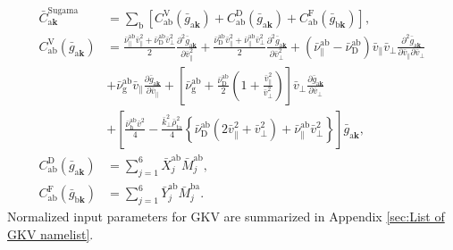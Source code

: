 \begin{align}
  \bar{C}_{\mathrm{a}\bm{k}}^\mathrm{Sugama} &= \sum_\mathrm{b} \left[ C^\mathrm{V}_\mathrm{ab}(\bar{g}_{\mathrm{a}\bm{k}}) + C^\mathrm{D}_\mathrm{ab}(\bar{g}_{\mathrm{a}\bm{k}}) + C^\mathrm{F}_\mathrm{ab}(\bar{g}_{\mathrm{b}\bm{k}}) \right], \\
  C^\mathrm{V}_\mathrm{ab}(\bar{g}_{\mathrm{a}\bm{k}}) &= \frac{\bar{\nu}_\parallel^\mathrm{ab}\bar{v}_\parallel^2+\bar{\nu}_\mathrm{D}^\mathrm{ab}\bar{v}_\perp^2}{2}\frac{\partial^2 \bar{g}_{\mathrm{a}\bm{k}}}{\partial \bar{v}_\parallel^2} + \frac{\bar{\nu}_\mathrm{D}^\mathrm{ab}\bar{v}_\parallel^2+\bar{\nu}_\parallel^\mathrm{ab}\bar{v}_\perp^2}{2}\frac{\partial^2 \bar{g}_{\mathrm{a}\bm{k}}}{\partial \bar{v}_\perp^2} + (\bar{\nu}_\parallel^\mathrm{ab}-\bar{\nu}_\mathrm{D}^\mathrm{ab})\bar{v}_\parallel \bar{v}_\perp \frac{\partial^2 \bar{g}_{\mathrm{a}\bm{k}}}{\partial \bar{v}_\parallel \partial \bar{v}_\perp} \nonumber \\
  &+ \bar{\nu}_\mathrm{g}^\mathrm{ab} \bar{v}_\parallel \frac{\partial \bar{g}_{\mathrm{a}\bm{k}}}{\partial \bar{v}_\parallel} + \left[ \bar{\nu}_\mathrm{g}^\mathrm{ab} + \frac{\bar{\nu}_\mathrm{D}^\mathrm{ab}}{2} \left( 1 + \frac{\bar{v}_\parallel^2}{\bar{v}_\perp^2} \right) \right] \bar{v}_\perp \frac{\partial \bar{g}_{\mathrm{a}\bm{k}}}{\partial \bar{v}_\perp} \nonumber \\
  &+\left[ \frac{\bar{\nu}_\mathrm{h}^\mathrm{ab} \bar{v}^2}{4} - \frac{\bar{k}_\perp^2\bar{\rho}_\mathrm{ta}^2}{4} \left\{ \bar{\nu}_\mathrm{D}^\mathrm{ab} (2\bar{v}_\parallel^2 + \bar{v}_\perp^2) + \bar{\nu}_\parallel^\mathrm{ab} \bar{v}_\perp^2 \right\} \right] \bar{g}_{\mathrm{a}\bm{k}}, \\
  C^\mathrm{D}_\mathrm{ab}(\bar{g}_{\mathrm{a}\bm{k}}) &= \sum_{j=1}^6 \bar{X}_j^\mathrm{ab} \bar{M}_j^\mathrm{ab}, \\ 
  C^\mathrm{F}_\mathrm{ab}(\bar{g}_{\mathrm{b}\bm{k}}) &= \sum_{j=1}^6 \bar{Y}_j^\mathrm{ab} \bar{M}_j^\mathrm{ba}.
\end{align}
Normalized input parameters for GKV are summarized in Appendix \ref{sec:List of GKV namelist}.



